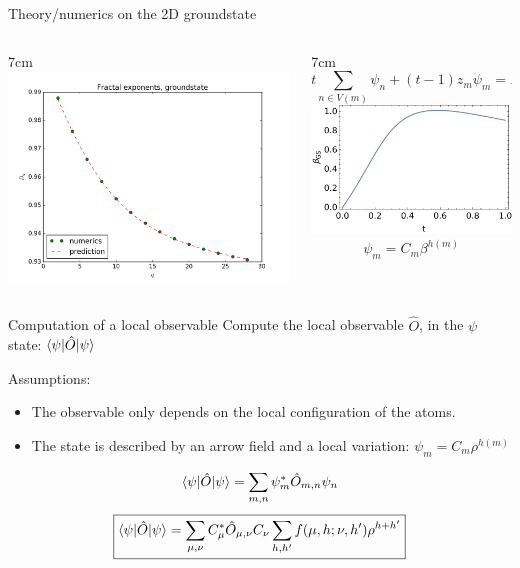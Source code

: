 \documentclass[xcolor=x11names,compress,professionalfonts, aspectratio=169]{beamer}
\renewcommand{\(}{\begin{columns}}
\renewcommand{\)}{\end{columns}}
\newcommand{\<}[1]{\begin{column}{#1}}
\renewcommand{\>}{\end{column}}
\begin{document}
\begin{frame}{Theory/numerics on the 2D groundstate}
\begin{columns}
\<{7cm}
\centering
\includegraphics[scale=.4]{img/fractal_exponents_groundstate.png}
\>
\<{7cm}
\[
	t \sum_{n \in V(m)} \psi_n + (t-1)z_m \psi_m = E \psi_m
\]
\centering
\includegraphics[scale=.6]{img/beta_t.pdf}
\[
	\psi_m = C_m \beta^{h(m)}
\]
\>
\end{columns}
\end{frame}

\begin{frame}{Computation of a local observable}
Compute the local observable $\hat{O}$, in the $\psi$ state: $\braket{\psi | \hat{O} | \psi}$

Assumptions:
\begin{itemize}
	\item The observable only depends on the local configuration of the atoms.
	\item The state is described by an arrow field and a local variation: $\psi_m = C_m \rho^{h(m)}$
\end{itemize}
\[
	\braket{\psi | \hat{O} | \psi} = \sum_{m,n} \psi_m^* \hat{O}_{m,n} \psi_n
\]
\[
\boxed{\braket{\psi | \hat{O} | \psi} = \sum_{\mu, \nu}C_{\mu}^* \hat{O}_{\mu,\nu} C_{\nu} \sum_{h,h'} f(\mu, h; \nu, h') \rho^{h+h'}}
\]
\end{frame}
\end{document}
